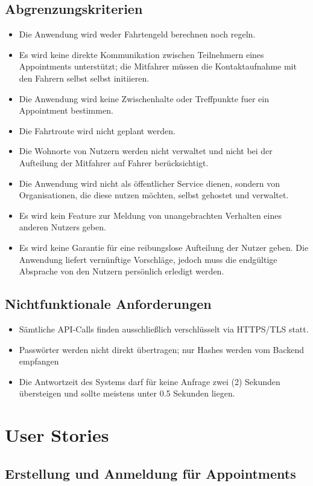 \documentclass[11pt,a4paper]{article}
\begin{document}
\subsection{Abgrenzungskriterien}
\begin{itemize}
\item Die Anwendung wird weder Fahrtengeld berechnen noch regeln.
\item Es wird keine direkte Kommunikation zwischen Teilnehmern eines Appointments unterstützt; die Mitfahrer müssen die Kontaktaufnahme mit den Fahrern selbst selbst initiieren.
\item Die Anwendung wird keine Zwischenhalte oder Treffpunkte fuer ein Appointment bestimmen.
\item Die Fahrtroute wird nicht geplant werden.
\item Die Wohnorte von Nutzern werden nicht verwaltet und nicht bei der Aufteilung der Mitfahrer auf Fahrer berücksichtigt.
\item Die Anwendung wird nicht als öffentlicher Service dienen, sondern von Organisationen, die diese nutzen möchten, selbst gehostet und verwaltet.
\item Es wird kein Feature zur Meldung von unangebrachten Verhalten eines anderen Nutzers geben.
\item Es wird keine Garantie für eine reibungslose Aufteilung der Nutzer geben. Die Anwendung liefert vernünftige Vorschläge, jedoch muss die endgültige Absprache von den Nutzern persönlich erledigt werden.
\end{itemize}

\subsection{Nichtfunktionale Anforderungen}
\begin{itemize}
\item Sämtliche API-Calls finden ausschließlich verschlüsselt via HTTPS/TLS statt.
\item Passwörter werden nicht direkt übertragen; nur Hashes werden vom Backend empfangen
\item Die Antwortzeit des Systems darf für keine Anfrage zwei (2) Sekunden übersteigen und sollte meistens unter 0.5 Sekunden liegen.
\end{itemize}


\section{User Stories}
\subsection{Erstellung und Anmeldung für Appointments}
\end{document}

